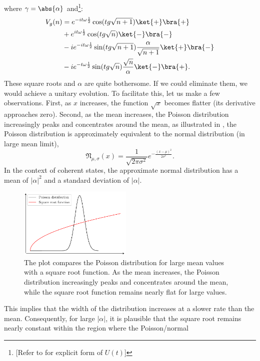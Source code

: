 where \(\gamma = \abs{\alpha}\) and\footnote{[Refer to  for explicit form of \(U(t)\)]}:
\begin{align}
        \label{eq:appen_JCM_V_g}
    V_g (n) &=e^{-it\omega\frac{1}{2}}  \cos(tg\sqrt{n + 1})\ket{+}\bra{+}\\
&+ e^{it\omega\frac{1}{2}} \cos(tg\sqrt{n})\ket{-}\bra{-}\\
&- ie^{-it\omega\frac{1}{2}} \sin(tg\sqrt{n + 1}) \frac{\alpha}{\sqrt{n + 1}} \ket{+}\bra{-}\\
&- ie^{-t\omega\frac{1}{2}} \sin(tg\sqrt{n}) \frac{\sqrt{n}}{\alpha} \ket{-}\bra{+}.
\end{align}
These square roots and \(\alpha\) are quite bothersome. If we could eliminate them, we would achieve a unitary evolution. To facilitate this, let us make a few observations. First, as \( x \) increases, the function
\( \sqrt{x} \) becomes flatter (its derivative approaches zero).  Second, as the mean increases, the Poisson distribution increasingly peaks and concentrates around the mean, as illustrated in , the Poisson distribution is approximately equivalent to the normal distribution (in large mean limit), 
\begin{equation}
\mathfrak{N}_{\mu, \sigma}(x) = \frac{1}{\sqrt{2\pi\sigma^2}} e^{-\frac{(x-\mu)^2}{2\sigma^2}}.
\end{equation}
In the context of coherent states, the approximate normal distribution has a mean of \( |\alpha|^2 \) and a
standard deviation of \( |\alpha| \). 
\begin{figure}
  \centering
  \includegraphics[width=0.48\textwidth]{figures/chap5/poisson_distribution.pdf}
  \caption{The plot compares the Poisson distribution for large mean values with a square root function. As the mean increases, the Poisson distribution increasingly peaks and concentrates around the mean, while the square root function remains nearly flat for large values. }
  \label{fig:poission_sqrt}
\end{figure} 
This implies that the width of the distribution increases at a slower rate than the mean. Consequently, for large \( |\alpha| \), it is plausible that the square root remains nearly constant within the region where the Poisson/normal 
